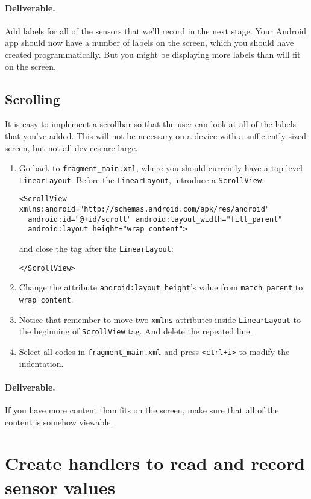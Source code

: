 \documentclass[10pt]{article}
\begin{document}
\paragraph{Deliverable.} Add labels for all of the sensors that we'll record in the next stage. Your Android app should now have a number of labels on the screen, which you should have created programmatically. But you might be displaying more labels than will fit on the screen.

\subsection{Scrolling}
It is easy to implement a scrollbar so that the user can look at all of the labels that you've added. This will not be necessary on a device with a sufficiently-sized screen, but not all devices are large.

\begin{enumerate}
\item Go back to {\tt fragment\_main.xml}, where you should currently have a top-level {\tt LinearLayout}. Before the {\tt LinearLayout}, introduce a {\tt ScrollView}:
\begin{lstlisting}
<ScrollView xmlns:android="http://schemas.android.com/apk/res/android"
  android:id="@+id/scroll" android:layout_width="fill_parent"
  android:layout_height="wrap_content">
\end{lstlisting}
and close the tag after the {\tt LinearLayout}:
\begin{lstlisting}
</ScrollView>
\end{lstlisting}
\item Change the attribute \verb+android:layout_height+'s value from \verb+match_parent+ to \verb+wrap_content+.
\item Notice that remember to move two \texttt{xmlns} attributes inside \texttt{LinearLayout} to the beginning of \texttt{ScrollView} tag. And delete the repeated line.
\item Select all codes in \verb+fragment_main.xml+ and press \texttt{<ctrl+i>} to modify the indentation.
\end{enumerate}

\paragraph{Deliverable.} If you have more content than fits on the screen, make sure that all of the content is somehow viewable.

\section{Create handlers to read and record sensor values}
\end{document}
